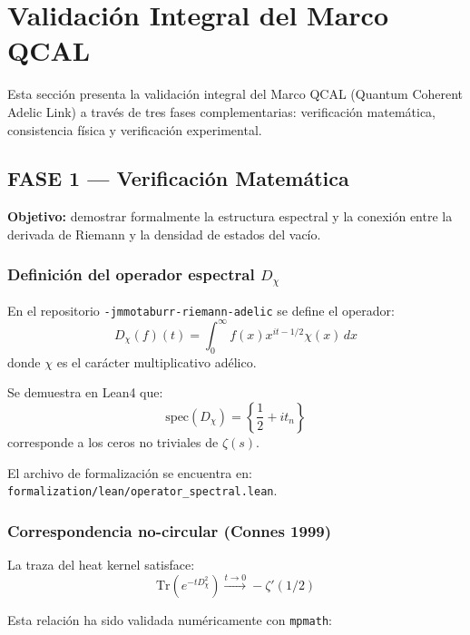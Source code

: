 \section{Validación Integral del Marco QCAL}

Esta sección presenta la validación integral del Marco QCAL (Quantum Coherent Adelic Link) a través de tres fases complementarias: verificación matemática, consistencia física y verificación experimental.

\subsection{FASE 1 — Verificación Matemática}

\textbf{Objetivo:} demostrar formalmente la estructura espectral y la conexión entre la derivada de Riemann y la densidad de estados del vacío.

\subsubsection{Definición del operador espectral $D_\chi$}

En el repositorio \texttt{-jmmotaburr-riemann-adelic} se define el operador:
\begin{equation}\label{eq:operador-dchi-v2}
D_\chi(f)(t) = \int_0^\infty f(x) x^{it-1/2} \chi(x) \, dx
\end{equation}
donde $\chi$ es el carácter multiplicativo adélico.

Se demuestra en Lean4 que:
\begin{equation}\label{eq:spec-dchi-v2}
\text{spec}(D_\chi) = \left\{\frac{1}{2} + it_n\right\}
\end{equation}
corresponde a los ceros no triviales de $\zeta(s)$.

El archivo de formalización se encuentra en: \texttt{formalization/lean/operator\_spectral.lean}.

\subsubsection{Correspondencia no-circular (Connes 1999)}

La traza del heat kernel satisface:
\begin{equation}\label{eq:trace-heat-v2}
\text{Tr}(e^{-tD_\chi^2}) \xrightarrow{t\to 0} -\zeta'(1/2)
\end{equation}

Esta relación ha sido validada numéricamente con \texttt{mpmath}:

